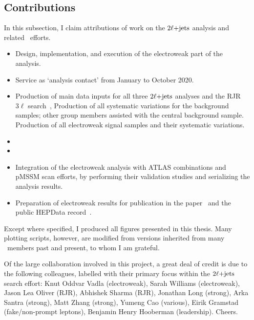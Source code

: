 \FloatBarrier
\subsection{Contributions}

In this subsection, I claim attributions of work on the $2\ell\mathrm{+jets}$ analysis
and related \atlas\ efforts.

\begin{itemize}
\item Design, implementation, and execution of the electroweak part of the analysis.
\item Service as `analysis contact' from January to October 2020.
\item Production of main data inputs for all three $2\ell\mathrm{+jets}$ analyses
and the RJR $3\ell$ search~\cite{atlas_rjr_3l_SUSY_2019_09},
Production of all systematic variations for the background samples;
other group members assisted with the central background sample.
Production of all electroweak signal samples and their systematic variations.
\item {}
\item {}
\item Integration of the electroweak analysis with ATLAS combinations and
pMSSM scan efforts, by performing their validation studies and serializing the
analysis results.
\item Preparation of electroweak results for publication in the
paper~\cite{atlas2022searches} and the public HEPData
record~\cite{maguire2017hepdata}.
\end{itemize}
Except where specified, I produced all figures presented in this thesis.
Many plotting scripts, however, are modified from versions inherited from
many \atlas\ members past and present, to whom I am grateful.

Of the large collaboration involved in this project, a great deal of credit is
due to the following colleagues, labelled with their primary focus within
the $2\ell\mathrm{+jets}$ search effort:
Knut Oddvar Vadla (electroweak),
Sarah Williams (electroweak),
Jason Lea Oliver (RJR),
Abhishek Sharma (RJR),
Jonathan Long (strong),
Arka Santra (strong),
Matt Zhang (strong),
Yumeng Cao (various),
Eirik Gramstad (fake/non-prompt leptons),
Benjamin Henry Hooberman (leadership).
Cheers.

